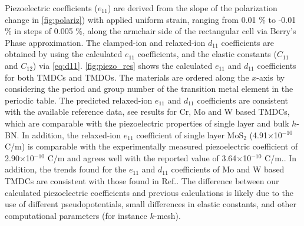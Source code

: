 Piezoelectric coefficients ($e_{11}$) are derived from the slope of the polarization change in \autoref{fig:polariz}) with applied uniform strain, ranging from 0.01 \% to -0.01 \% in steps of 0.005 \%, along the armchair side of the rectangular cell via Berry's Phase approximation\cite{vanderbilt2000}. The clamped-ion and relaxed-ion $d_{11}$ coefficients are obtained by using the calculated $e_{11}$ coefficients, and the elastic constants ($C_{11}$ and $C_{12}$) via \autoref{eq:d11}. \autoref{fig:piezo_res} shows the calculated $e_{11}$ and $d_{11}$ coefficients for both TMDCs and TMDOs. The materials are ordered along the $x$-axis by considering the period and group number of the transition metal element in the periodic table. The predicted relaxed-ion $e_{11}$ and $d_{11}$ coefficients are consistent with the available reference data\cite{Duerloo2012,crs2}, see results for Cr, Mo and W based TMDCs, which are comparable with the piezoelectric properties of single layer and bulk $h$-BN\cite{Duerloo2012,km-2009,km-2011a,km-2011b}. In addition, the relaxed-ion $e_{11}$ coefficient of single layer MoS$_{2}$ (4.91$\times$10$^{-10}$ C/m) is comparable with the experimentally measured piezoelectric coefficient of 2.90$\times$10$^{-10}$ C/m\cite{Zhu2015} and agrees  well  with the reported value of 3.64$\times$10$^{-10}$ C/m.\cite{Duerloo2012}. In addition, the trends found for the $e_{11}$ and $d_{11}$ coefficients of Mo and W based TMDCs are consistent with those found in Ref.\cite{Duerloo2012}. The difference between our calculated piezoelectric coefficients and previous calculations is likely due to the use of different pseudopotentials, small differences in elastic constants, and other computational parameters (for instance $k$-mesh).

